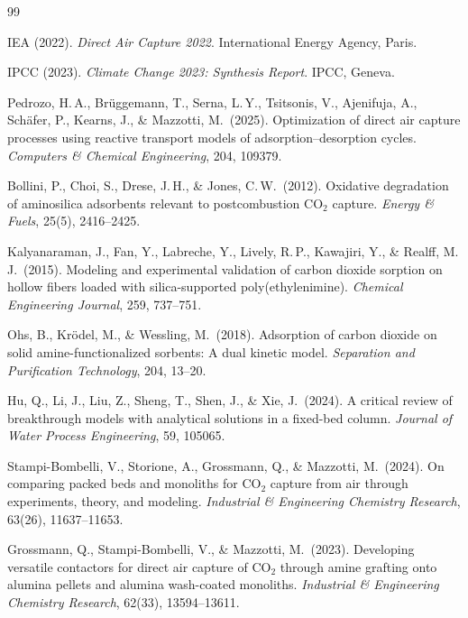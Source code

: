 \documentclass[a4paper]{amsart}
\theoremstyle{definition}
\begin{document}
\begin{thebibliography}{99}

IEA (2022). \textit{Direct Air Capture 2022}.  International Energy Agency,
Paris.

IPCC (2023). \textit{Climate Change 2023: Synthesis Report}.  IPCC, Geneva.

Pedrozo, H.\,A., Br\"uggemann, T., Serna, L.\,Y., Tsitsonis, V., Ajenifuja, A.,
  Sch\"afer, P., Kearns, J., \& Mazzotti, M.\ (2025).
Optimization of direct air capture processes using reactive transport models
  of adsorption--desorption cycles.
\textit{Computers \& Chemical Engineering}, 204, 109379.

Bollini, P., Choi, S., Drese, J.\,H., \& Jones, C.\,W.\ (2012).
Oxidative degradation of aminosilica adsorbents relevant to postcombustion
  CO$_2$ capture.
\textit{Energy \& Fuels}, 25(5), 2416--2425.

Kalyanaraman, J., Fan, Y., Labreche, Y., Lively, R.\,P., Kawajiri, Y.,
  \& Realff, M.\,J.\ (2015).
Modeling and experimental validation of carbon dioxide sorption on hollow
  fibers loaded with silica-supported poly(ethylenimine).
\textit{Chemical Engineering Journal}, 259, 737--751.

Ohs, B., Kr\"{o}del, M., \& Wessling, M.\ (2018).
Adsorption of carbon dioxide on solid amine-functionalized sorbents:
  A dual kinetic model.
\textit{Separation and Purification Technology}, 204, 13--20.

Hu, Q., Li, J., Liu, Z., Sheng, T., Shen, J., \& Xie, J.\ (2024).
A critical review of breakthrough models with analytical solutions in a
  fixed-bed column.
\textit{Journal of Water Process Engineering}, 59, 105065.

Stampi-Bombelli, V., Storione, A., Grossmann, Q., \& Mazzotti, M.\ (2024).
On comparing packed beds and monoliths for CO$_2$ capture from air through
  experiments, theory, and modeling.
\textit{Industrial \& Engineering Chemistry Research}, 63(26), 11637--11653.

Grossmann, Q., Stampi-Bombelli, V., \& Mazzotti, M.\ (2023).
Developing versatile contactors for direct air capture of CO$_2$ through
  amine grafting onto alumina pellets and alumina wash-coated monoliths.
\textit{Industrial \& Engineering Chemistry Research}, 62(33), 13594--13611.


\end{thebibliography}
\end{document}
